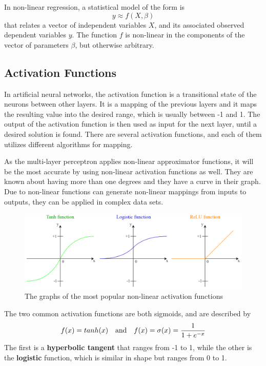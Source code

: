 In non-linear regression, a statistical model of the form is
$$ y \approx f(X,\beta) $$
that relates a vector of independent variables $X$, and its associated observed dependent variables $y$. The function $f$ is non-linear in the components of the vector of parameters $\beta$, but otherwise arbitrary. 



\subsection{Activation Functions}

In artificial neural networks, the activation function is a transitional state of the neurons between other layers. It is a mapping of the previous layers and it maps the resulting value into the desired range, which is usually between -1 and 1. The output of the activation function is then used as input for the next layer, until a desired solution is found. There are several activation functions, and each of them utilizes different algorithms for mapping. \smallskip

As the multi-layer perceptron applies non-linear approximator functions, it will be the most accurate by using non-linear activation functions as well. They are known about having more than one degrees and they have a curve in their graph. Due to non-linear functions can generate non-linear mappings from inputs to outputs, they can be applied in complex data sets. 

\begin{figure}[h]
	\centering
	\includegraphics[height=0.35\linewidth]{./figures/functions}
	\caption{The graphs of the most popular non-linear activation functions}
	\label{fig:functions}
\end{figure}

The two common activation functions are both sigmoids, and are described by
$$ f(x)=tanh(x) ~~~ \hbox{and} ~~~ f(x)=\sigma (x)=\frac{1}{1+e^{-x}} $$
The first is a \textbf{hyperbolic tangent} that ranges from -1 to 1, while the other is the \textbf{logistic} function, which is similar in shape but ranges from 0 to 1. \smallskip

